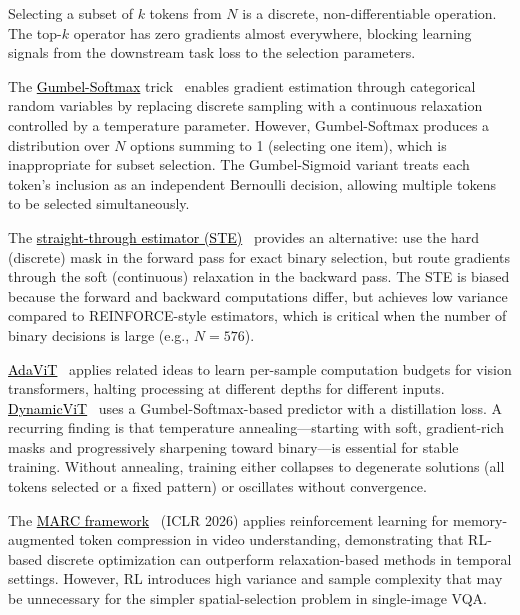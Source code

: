 \documentclass[11pt,twocolumn]{article}
\newcommand{\paperhref}[2]{\href{#1}{\textcolor{black}{#2}}}
\begin{document}
Selecting a subset of $k$ tokens from $N$ is a discrete, non-differentiable operation. The top-$k$ operator has zero gradients almost everywhere, blocking learning signals from the downstream task loss to the selection parameters.

The \paperhref{https://arxiv.org/abs/1611.01144}{Gumbel-Softmax} trick~\cite{jang2017categorical, maddison2017concrete} enables gradient estimation through categorical random variables by replacing discrete sampling with a continuous relaxation controlled by a temperature parameter. However, Gumbel-Softmax produces a distribution over $N$ options summing to 1 (selecting one item), which is inappropriate for subset selection. The Gumbel-Sigmoid variant treats each token's inclusion as an independent Bernoulli decision, allowing multiple tokens to be selected simultaneously.

The \paperhref{https://arxiv.org/abs/1308.3432}{straight-through estimator (STE)}~\cite{bengio2013estimating} provides an alternative: use the hard (discrete) mask in the forward pass for exact binary selection, but route gradients through the soft (continuous) relaxation in the backward pass. The STE is biased because the forward and backward computations differ, but achieves low variance compared to REINFORCE-style estimators, which is critical when the number of binary decisions is large (e.g., $N = 576$).

\paperhref{https://openaccess.thecvf.com/content/CVPR2022/papers/Meng_AdaViT_Adaptive_Vision_Transformers_for_Efficient_Image_Recognition_CVPR_2022_paper.pdf}{AdaViT}~\cite{meng2022adavit} applies related ideas to learn per-sample computation budgets for vision transformers, halting processing at different depths for different inputs. \paperhref{https://arxiv.org/abs/2106.02034}{DynamicViT}~\cite{rao2021dynamicvit} uses a Gumbel-Softmax-based predictor with a distillation loss. A recurring finding is that temperature annealing---starting with soft, gradient-rich masks and progressively sharpening toward binary---is essential for stable training. Without annealing, training either collapses to degenerate solutions (all tokens selected or a fixed pattern) or oscillates without convergence.

The \paperhref{https://openreview.net/forum?id=7k8OtrGxBs}{MARC framework}~\cite{wang2026marc} (ICLR 2026) applies reinforcement learning for memory-augmented token compression in video understanding, demonstrating that RL-based discrete optimization can outperform relaxation-based methods in temporal settings. However, RL introduces high variance and sample complexity that may be unnecessary for the simpler spatial-selection problem in single-image VQA.
\end{document}
